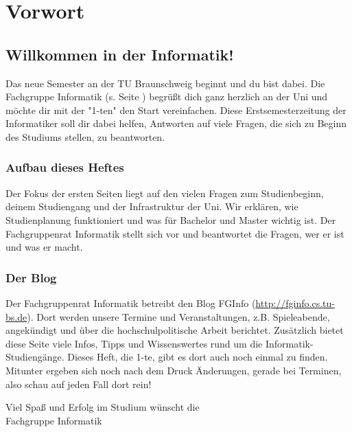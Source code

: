 
\section{Vorwort}
\label{vorwort}
	\begin{multicols}{2}
	\subsection*{Willkommen in der Informatik!}	

	Das neue Semester an der TU Braunschweig beginnt und du bist dabei. Die Fachgruppe Informatik (s. Seite \pageref{fachgruppe}) begrüßt dich ganz herzlich an der Uni und möchte dir mit der "1-ten" den Start vereinfachen. Diese Erstsemesterzeitung der Informatiker soll dir dabei helfen, Antworten auf viele Fragen, die sich zu Beginn des Studiums stellen, zu beantworten.

	\subsubsection*{Aufbau dieses Heftes}
		Der Fokus der ersten Seiten liegt auf den vielen Fragen zum Studienbeginn, deinem Studiengang und der Infrastruktur der Uni. Wir erklären, wie Studienplanung funktioniert und was für Bachelor und Master wichtig ist.
Der Fachgruppenrat Informatik stellt sich vor und beantwortet die Fragen, wer er ist und was er macht. 
\columnbreak
	\subsubsection*{Der Blog}
		Der Fachgruppenrat Informatik betreibt den Blog FGInfo (\url{http://fginfo.cs.tu-bs.de}). Dort werden unsere Termine und Veranstaltungen, z.B. Spieleabende, angekündigt und über die hochschulpolitische Arbeit berichtet.
Zusätzlich bietet diese Seite viele Infos, Tipps und Wissenswertes rund um die Informatik-Studiengänge.
Dieses Heft, die 1-te, gibt es dort auch noch einmal zu finden. Mitunter
ergeben sich noch nach dem Druck Änderungen, gerade bei Terminen, also schau auf jeden Fall dort rein!

	\vspace*{0.5cm}

	Viel Spaß und Erfolg im  Studium wünscht  die\\
	\hspace*{2cm}Fachgruppe Informatik
	\end{multicols}
	\vspace{0.5cm}
